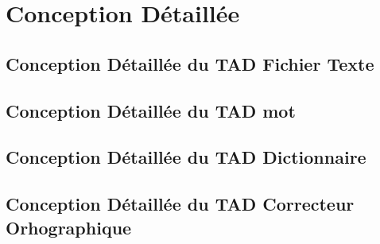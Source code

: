 \section{Conception Détaillée}
	\subsection{Conception Détaillée du TAD Fichier Texte}
		
		
	\subsection{Conception Détaillée du TAD mot}
		
		
	\subsection{Conception Détaillée du TAD Dictionnaire}
		
	\newpage
	\subsection{Conception Détaillée du TAD Correcteur Orhographique}
		
		

